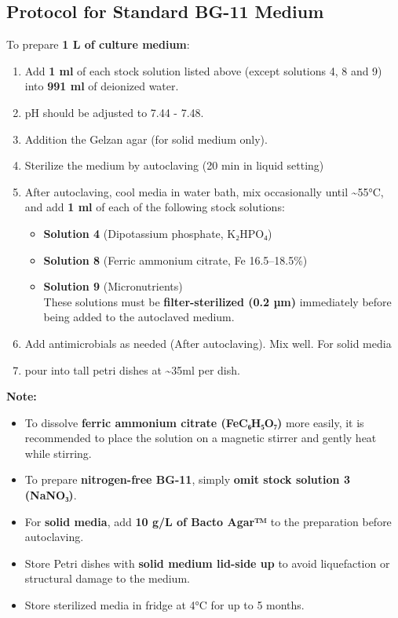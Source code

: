 \documentclass[
  11pt,
]{article}
\providecommand{\tightlist}{%
  \setlength{\itemsep}{0pt}\setlength{\parskip}{0pt}}
\begin{document}
\subsection{Protocol for Standard BG-11
Medium}\label{protocol-for-standard-bg-11-medium}

To prepare \textbf{1 L of culture medium}:

\begin{enumerate}
\def\labelenumi{\arabic{enumi}.}
\tightlist
\item
  Add \textbf{1 ml} of each stock solution listed above (except
  solutions 4, 8 and 9) into \textbf{991 ml} of deionized water.
\item
  pH should be adjusted to 7.44 - 7.48.
\item
  Addition the Gelzan agar (for solid medium only).
\item
  Sterilize the medium by autoclaving (20 min in liquid setting)
\item
  After autoclaving, cool media in water bath, mix occasionally until
  \textasciitilde55°C, and add \textbf{1 ml} of each of the following
  stock solutions:

  \begin{itemize}
  \tightlist
  \item
    \textbf{Solution 4} (Dipotassium phosphate, K₂HPO₄)\\
  \item
    \textbf{Solution 8} (Ferric ammonium citrate, Fe 16.5--18.5\%)\\
  \item
    \textbf{Solution 9} (Micronutrients)\\
    These solutions must be \textbf{filter-sterilized (0.2 µm)}
    immediately before being added to the autoclaved medium.\\
  \end{itemize}
\item
  Add antimicrobials as needed (After autoclaving). Mix well. For solid
  media
\item
  pour into tall petri dishes at \textasciitilde35ml per dish.
\end{enumerate}

\textbf{Note:}

\begin{itemize}
\tightlist
\item
  To dissolve \textbf{ferric ammonium citrate (FeC₆H₅O₇)} more easily,
  it is recommended to place the solution on a magnetic stirrer and
  gently heat while stirring.
\item
  To prepare \textbf{nitrogen-free BG-11}, simply \textbf{omit stock
  solution 3 (NaNO₃)}.\\
\item
  For \textbf{solid media}, add \textbf{10 g/L of Bacto Agar™} to the
  preparation before autoclaving.
\item
  Store Petri dishes with \textbf{solid medium lid-side up} to avoid
  liquefaction or structural damage to the medium.
\item
  Store sterilized media in fridge at 4°C for up to 5 months.
\end{itemize}
\end{document}
